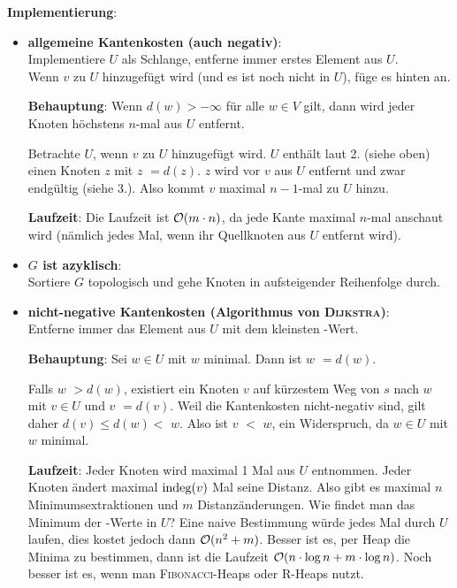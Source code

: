 \textbf{Implementierung}:
\begin{itemize}
    \item
    \textbf{allgemeine Kantenkosten (auch negativ)}: \\
    Implementiere $U$ als Schlange, entferne immer erstes Element aus $U$. \\
    Wenn $v$ zu $U$ hinzugefügt wird (und es ist noch nicht in $U$), füge es
    hinten an.

    \textbf{Behauptung}:
    Wenn $d(w) > -\infty$ für alle $w \in V$ gilt, dann wird jeder Knoten
    höchstens $n$-mal aus $U$ entfernt.

    \begin{Beweis}
        Betrachte $U$, wenn $v$ zu $U$ hinzugefügt wird.
        $U$ enthält laut 2. (siehe oben) einen Knoten $z$ mit
        \code{dist[}$z$\code{]} $= d(z)$.
        $z$ wird vor $v$ aus $U$ entfernt und zwar endgültig (siehe 3.).
        Also kommt $v$ maximal $n-1$-mal zu $U$ hinzu.
    \end{Beweis}

    \textbf{Laufzeit}:
    Die Laufzeit ist $\mathcal{O}(m \cdot n)$, da jede Kante maximal $n$-mal anschaut
    wird (nämlich jedes Mal, wenn ihr Quellknoten aus $U$ entfernt wird).

    \item
    \textbf{$G$ ist azyklisch}: \\
    Sortiere $G$ topologisch und gehe Knoten in aufsteigender
    Reihenfolge durch.

    \item
    \textbf{nicht-negative Kantenkosten (Algorithmus von \textsc{Dijkstra})}:
    \\
    Entferne immer das Element aus $U$ mit dem kleinsten -Wert.

    \textbf{Behauptung}:
    Sei $w \in U$ mit \code{dist[}$w$\code{]} minimal.
    Dann ist \code{dist[}$w$\code{]} $= d(w)$.

    \begin{Beweis}
        Falls \code{dist[}$w$\code{]} $> d(w)$, existiert ein Knoten
        $v$ auf kürzestem Weg von $s$ nach $w$ mit $v \in U$
        und \code{dist[}$v$\code{]} $= d(v)$.
        Weil die Kantenkosten nicht-negativ sind, gilt daher
        $d(v) \le d(w) <$ \code{dist[}$w$\code{]}.
        Also ist \code{dist[}$v$\code{]} $<$ \code{dist[}$w$\code{]}, ein
        Widerspruch, da $w \in U$ mit \code{dist[}$w$\code{]} minimal.
    \end{Beweis}

    \textbf{Laufzeit}: Jeder Knoten wird maximal 1 Mal aus $U$ entnommen.
    Jeder Knoten ändert maximal $\operatorname{indeg}(v)$ Mal seine Distanz.
    Also gibt es maximal $n$ Minimumsextraktionen und $m$ Distanzänderungen.
    Wie findet man das Minimum der -Werte in $U$?
    Eine naive Bestimmung würde jedes Mal durch $U$ laufen, dies kostet
    jedoch dann $\mathcal{O}(n^2 + m)$.
    Besser ist es, per Heap die Minima zu bestimmen, dann ist die Laufzeit
    $\mathcal{O}(n \cdot \log n + m \cdot \log n)$.
    Noch besser ist es, wenn man \textsc{Fibonacci}-Heaps oder R-Heaps nutzt.
\end{itemize}

